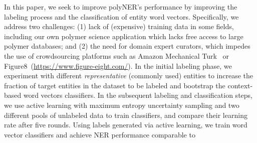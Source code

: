 In this paper, we seek to improve polyNER's performance by improving the labeling process and the classification of entity word vectors. 
Specifically, we address two challenges: 
(1) lack of (expensive) training data in some fields, including our own polymer science application which lacks free access to large polymer databases; and 
(2) the need for domain expert curators, which impedes the use of crowdsourcing platforms such as Amazon Mechanical Turk~\cite{buhrmester2011amazon} or Figure8~(\url{https://www.figure-eight.com/}).
In the initial labeling phase, 
we experiment with different \textit{representative} (commonly used) entities to increase the fraction of target entities in the dataset to be labeled and bootstrap the context-based word vectors classifiers. %
In the subsequent labeling and classification steps,
we use active learning with maximum entropy uncertainty sampling and two different pools of unlabeled data to train classifiers, and compare their learning rate after five rounds. 
Using labels generated via active learning, we train word vector classifiers and achieve NER performance comparable to 
